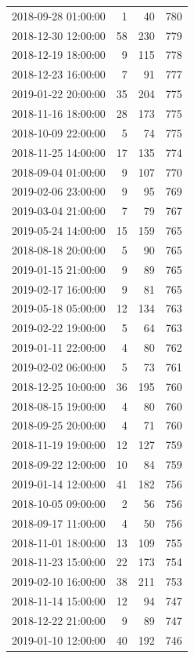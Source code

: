 \begin{tabular}{lrrr}
2018-09-28 01:00:00 & 1 & 40 & 780 \\
2018-12-30 12:00:00 & 58 & 230 & 779 \\
2018-12-19 18:00:00 & 9 & 115 & 778 \\
2018-12-23 16:00:00 & 7 & 91 & 777 \\
2019-01-22 20:00:00 & 35 & 204 & 775 \\
2018-11-16 18:00:00 & 28 & 173 & 775 \\
2018-10-09 22:00:00 & 5 & 74 & 775 \\
2018-11-25 14:00:00 & 17 & 135 & 774 \\
2018-09-04 01:00:00 & 9 & 107 & 770 \\
2019-02-06 23:00:00 & 9 & 95 & 769 \\
2019-03-04 21:00:00 & 7 & 79 & 767 \\
2019-05-24 14:00:00 & 15 & 159 & 765 \\
2018-08-18 20:00:00 & 5 & 90 & 765 \\
2019-01-15 21:00:00 & 9 & 89 & 765 \\
2019-02-17 16:00:00 & 9 & 81 & 765 \\
2019-05-18 05:00:00 & 12 & 134 & 763 \\
2019-02-22 19:00:00 & 5 & 64 & 763 \\
2019-01-11 22:00:00 & 4 & 80 & 762 \\
2019-02-02 06:00:00 & 5 & 73 & 761 \\
2018-12-25 10:00:00 & 36 & 195 & 760 \\
2018-08-15 19:00:00 & 4 & 80 & 760 \\
2018-09-25 20:00:00 & 4 & 71 & 760 \\
2018-11-19 19:00:00 & 12 & 127 & 759 \\
2018-09-22 12:00:00 & 10 & 84 & 759 \\
2019-01-14 12:00:00 & 41 & 182 & 756 \\
2018-10-05 09:00:00 & 2 & 56 & 756 \\
2018-09-17 11:00:00 & 4 & 50 & 756 \\
2018-11-01 18:00:00 & 13 & 109 & 755 \\
2018-11-23 15:00:00 & 22 & 173 & 754 \\
2019-02-10 16:00:00 & 38 & 211 & 753 \\
2018-11-14 15:00:00 & 12 & 94 & 747 \\
2018-12-22 21:00:00 & 9 & 89 & 747 \\
2019-01-10 12:00:00 & 40 & 192 & 746 \\

\end{tabular}
